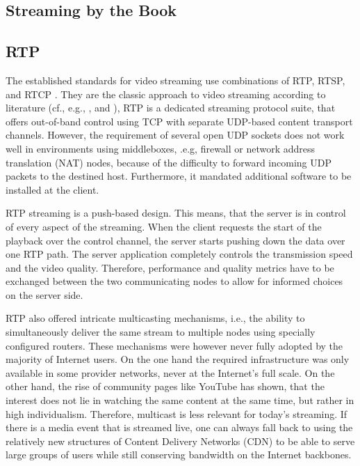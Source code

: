 \subsection{Streaming by the Book}
\subsection{RTP}


The established standards for video streaming use combinations of RTP, RTSP, and RTCP \cite{rfc3550, rfc2326}. They are the classic approach to video streaming according to literature (cf., e.g., \cite[p.~589ff]{kurose2008computer}, and \cite[p.~426ff]{peterson2007computer}),  RTP is a dedicated streaming protocol suite, that offers out-of-band control using TCP with separate UDP-based content transport channels. However, the requirement of several open UDP sockets does not work well in environments using middleboxes, .e.g, firewall or network address translation (NAT) nodes, because of the difficulty to forward incoming UDP packets to the destined host. Furthermore, it mandated additional software to be installed at the client. 

RTP streaming is a push-based design. This means, that the server is in control of every aspect of the streaming. When the client requests the start of the playback over the control channel, the server starts pushing down the data over one RTP path. The server application completely controls the transmission speed and the video quality. Therefore, performance and quality metrics have to be exchanged between the two communicating nodes to allow for informed choices on the server side.

RTP also offered intricate multicasting mechanisms, i.e., the ability to simultaneously deliver the same stream to multiple nodes using specially configured routers. These mechanisms were however never fully adopted by the majority of Internet users. On the one hand the required infrastructure was only available in some provider networks, never at the Internet's full scale. On the other hand, the rise of community pages like YouTube has shown, that the interest does not lie in watching the same content at the same time, but rather in high individualism. Therefore, multicast is less relevant for today's streaming. If there is a media event that is streamed live, one can always fall back to using the relatively new structures of Content Delivery Networks (CDN) to be able to serve large groups of users while still conserving bandwidth on the Internet backbones.

